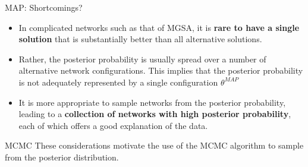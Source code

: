 \documentclass{beamer}
\begin{document}
\begin{frame}{MAP: Shortcomings?}
 
 \begin{itemize}
  \item  In
complicated networks such as that of MGSA, it is \textbf{rare to have a single
solution} that is substantially better than all alternative
solutions. 
\item Rather, the posterior probability is usually spread over a
number of alternative network configurations. This implies that the
posterior probability is not adequately represented by a single
configuration $\theta^{MAP}$
\item It is more appropriate to
sample networks from the posterior probability, leading to a
\textbf{collection of networks with high posterior probability}, each of
which offers a good explanation of the data. 
 \end{itemize}
\begin{mybluebox}{MCMC}
These considerations motivate the
use of the MCMC algorithm to sample from the posterior distribution.
\end{mybluebox}

 
 
\end{frame}
\end{document}
